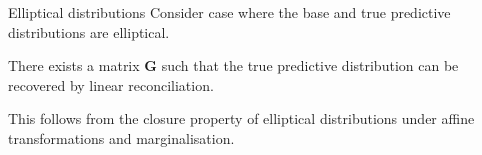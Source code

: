 \documentclass{beamer}
\begin{document}
  \begin{frame}{Elliptical distributions}
  	Consider case where the base and true predictive distributions are elliptical.
  	\begin{theorem}
  		There exists a matrix $\bm{G}$ such that the true predictive distribution can be recovered by linear reconciliation.
  	\end{theorem}
    This follows from the closure property of elliptical distributions under affine transformations and marginalisation.  
  \end{frame}
\end{document}
